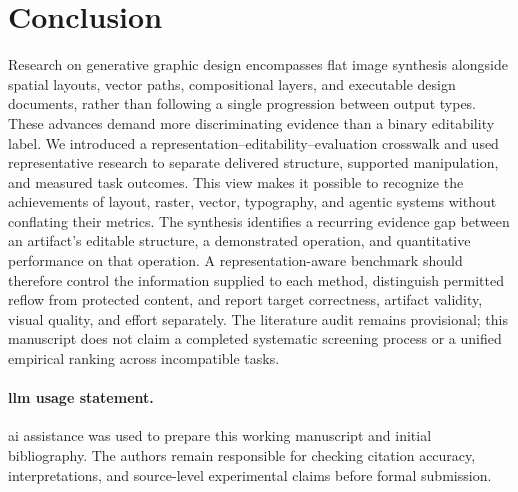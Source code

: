 \section{Conclusion}
\label{sec:conclusion}
Research on generative graphic design encompasses flat image synthesis alongside spatial layouts, vector paths, compositional layers, and executable design documents, rather than following a single progression between output types.
These advances demand more discriminating evidence than a binary editability label.
We introduced a representation--editability--evaluation crosswalk and used representative research to separate delivered structure, supported manipulation, and measured task outcomes.
This view makes it possible to recognize the achievements of layout, raster, vector, typography, and agentic systems without conflating their metrics.
The synthesis identifies a recurring evidence gap between an artifact's editable structure, a demonstrated operation, and quantitative performance on that operation.
A representation-aware benchmark should therefore control the information supplied to each method, distinguish permitted reflow from protected content, and report target correctness, artifact validity, visual quality, and effort separately.
The literature audit remains provisional; this manuscript does not claim a completed systematic screening process or a unified empirical ranking across incompatible tasks.

\paragraph{\ac{llm} usage statement.}
\ac{ai} assistance was used to prepare this working manuscript and initial bibliography.
The authors remain responsible for checking citation accuracy, interpretations, and source-level experimental claims before formal submission.

